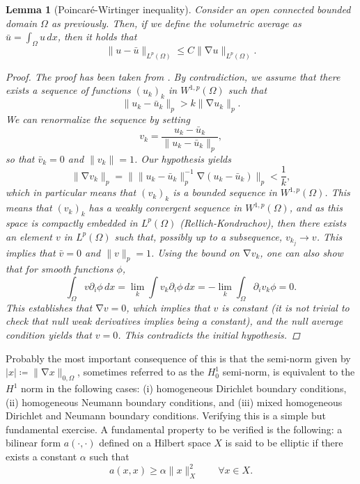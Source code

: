 \documentclass{article}
\DeclareMathOperator{\grad}{\nabla}
\newtheorem{lemma}{Lemma}
\begin{document}
\begin{lemma}[Poincaré-Wirtinger inequality]
    Consider an open connected bounded domain $\Omega$ as previously. Then, if we define the volumetric average as $\bar u = \int_\Omega u\,dx$, then it holds that
        $$ \| u - \bar u \|_{L^p(\Omega)} \leq C \| \grad u \|_{L^p(\Omega)}. $$
    \begin{proof}
        The proof has been taken from \cite{evans2022partial}. By contradiction, we assume that there exists a sequence of functions $(u_k)_k$ in $W^{1,p}(\Omega)$ such that
            $$ \| u_k - \bar u_k \|_p > k \| \grad u_k \|_p. $$
        We can renormalize the sequence by setting
            $$ v_k = \frac{u_k - \bar u_k}{\|u_k - \bar u_k\|_p}, $$
        so that $ \bar v_k = 0$ and $\| v_k \| = 1$. Our hypothesis yields
        $$ \| \grad v_k \|_p = \| \|u_k - \bar u_k\|_p^{-1} \grad (u_k - \bar u_k) \|_p < \frac 1 k,  $$
        which in particular means that $(v_k)_k$ is a bounded sequence in $W^{1,p}(\Omega)$. This means that $(v_k)_k$ has a weakly convergent sequence in $W^{1,p}(\Omega)$, and as this space is compactly embedded in $L^p(\Omega)$ (Rellich-Kondrachov), then there exists an element $v$ in $L^p(\Omega)$ such that, possibly up to a subsequence, $v_{k_j} \to v$. This implies that $\bar v=0$ and $\|v\|_p=1$. Using the bound on $\grad v_k$, one can also show that for smooth functions $\phi$, 
        $$ \int_\Omega v \partial_i \phi\,dx = \lim_k \int v_k \partial_i \phi\,dx = - \lim_k \int_\Omega \partial_i v_k \phi = 0. $$
        This establishes that $\grad v=0$, which implies that $v$ is constant (it is not trivial to check that null weak derivatives implies being a constant), and the null average condition yields that $v=0$. This contradicts the initial hypothesis. 
    \end{proof}
\end{lemma}

Probably the most important consequence of this is that the semi-norm given by $| x | \coloneqq \|\grad x\|_{0,\Omega}$, sometimes referred to as the $H_0^1$ semi-norm, is equivalent to the $H^1$ norm in the following cases: (i) homogeneous Dirichlet boundary conditions, (ii) homogeneous Neumann boundary conditions, and (iii) mixed homogeneous Dirichlet and Neumann boundary conditions. Verifying this is a simple but fundamental exercise. A fundamental property to be verified is the following: a bilinear form $a(\cdot, \cdot)$ defined on a Hilbert space $X$ is said to be elliptic if there exists a constant $\alpha$ such that
        $$ a(x, x) \geq \alpha \| x \|^2_X \qquad \forall x\in X. $$
\end{document}
